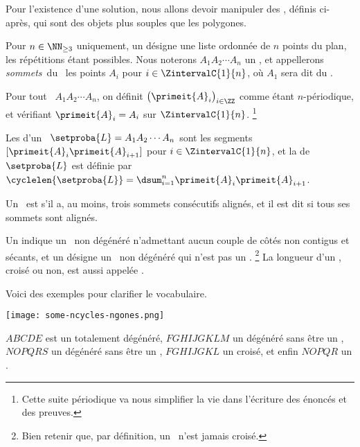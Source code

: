 Pour l'existence d'une solution, nous allons devoir manipuler des \ncycles, définis ci-après, qui sont des objets plus souples que les polygones.




\begin{defi}
	Pour $n \in \NN_{\geq3}$ uniquement, un \focus{\ncycle} désigne une liste ordonnée de $n$ points du plan, les répétitions étant possibles.
	Nous noterons $A_1 A_2 \cdots A_n$ un \ncycle, 
	et appellerons 
	\og \emph{sommets}\fg\ du \ncycle\ les points $A_i$ pour $i \in \ZintervalC{1}{n}$,
	où $A_1$ sera dit  du \ncycle.
\end{defi}


\begin{defi}
    Pour tout \ncycle\ $A_1 A_2 \cdots A_n$, on définit $\big( \primeit{A}_i \big)_{i \in \ZZ}$ comme étant $n$-périodique, et vérifiant $\primeit{A}_{i} = A_i$ sur $\ZintervalC{1}{n}$.%
	\footnote{
		Cette suite périodique va nous simplifier la vie dans l'écriture des énoncés et des preuves.
	}
\end{defi}


\begin{defi}
	Les  d'un \ncycle\ $\setproba{L} = A_1 A_2 \cdots A_n$ sont les segments
	$[\primeit{A}_i \primeit{A}_{i+1}]$ pour $i \in \ZintervalC{1}{n}$,
	et
	la  de $\setproba{L}$ est définie par $\cyclelen{\setproba{L}} = \dsum_{i=1}^{n} \primeit{A}_i \primeit{A}_{i+1}$.
\end{defi}


\begin{defi}
	Un \ncycle\ est  s'il a, au moins, trois sommets consécutifs alignés,
	et il est dit  si tous ses sommets sont alignés.
\end{defi}




\begin{defi} 
    Un \focus{\ngone} indique un \ncycle\ non dégénéré n'admettant aucun couple de côtés non contigus et sécants,
    et
    un  désigne un \ncycle\ non dégénéré qui n'est pas un \ngone.%
	\footnote{
		Bien retenir que, par définition, un \ngone\ n'est jamais croisé.
	}
	La longueur d'un \ngone, croisé ou non, est aussi appelée .
\end{defi}


\begin{remark} 
    Voici des exemples pour clarifier le vocabulaire.
    \begin{center}
    	\texttt{[image: some-ncycles-ngones.png]}
    \end{center}
    
    $ABCDE$ est un  totalement dégénéré,
    $FGHIJGKLM$ un  dégénéré sans être un ,
    $NOPQRS$ un  dégénéré sans être un ,
    $FGHIJGKL$ un  croisé, 
    et enfin
    $NOPQR$ un .
\end{remark}


